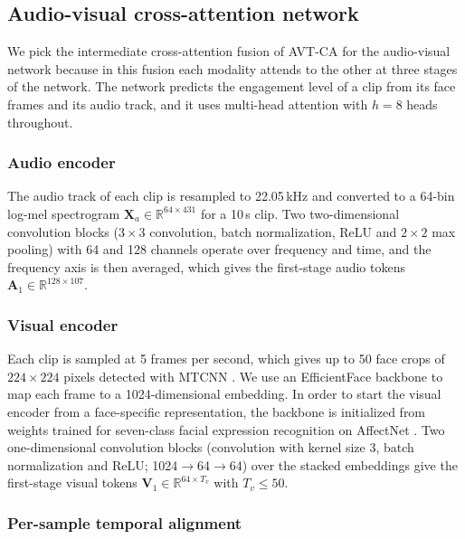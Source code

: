 \documentclass[pdflatex,iicol,sn-basic]{sn-jnl}
\begin{document}
\subsection{Audio-visual cross-attention network}\label{sec:method_av}

We pick the intermediate cross-attention fusion of AVT-CA \citep{venkatraman2025avtca} for the audio-visual network because in this fusion each modality attends to the other at three stages of the network. The network predicts the engagement level of a clip from its face frames and its audio track, and it uses multi-head attention with $h = 8$ heads throughout.

\subsubsection{Audio encoder}\label{sec:audio}

The audio track of each clip is resampled to 22.05\,kHz and converted to a 64-bin log-mel spectrogram $\mathbf{X}_a \in \mathbb{R}^{64 \times 431}$ for a 10\,s clip. Two two-dimensional convolution blocks ($3 \times 3$ convolution, batch normalization, ReLU and $2 \times 2$ max pooling) with 64 and 128 channels operate over frequency and time, and the frequency axis is then averaged, which gives the first-stage audio tokens $\mathbf{A}_1 \in \mathbb{R}^{128 \times 107}$.

\subsubsection{Visual encoder}\label{sec:visual}

Each clip is sampled at 5 frames per second, which gives up to 50 face crops of $224 \times 224$ pixels detected with MTCNN \citep{zhang2016mtcnn}. We use an EfficientFace backbone \citep{zhao2021efficientface} to map each frame to a 1024-dimensional embedding. In order to start the visual encoder from a face-specific representation, the backbone is initialized from weights trained for seven-class facial expression recognition on AffectNet \citep{mollahosseini2019affectnet}. Two one-dimensional convolution blocks (convolution with kernel size 3, batch normalization and ReLU; 1024$\to$64$\to$64) over the stacked embeddings give the first-stage visual tokens $\mathbf{V}_1 \in \mathbb{R}^{64 \times T_v}$ with $T_v \le 50$.

\subsubsection{Per-sample temporal alignment}\label{sec:align}
\end{document}
